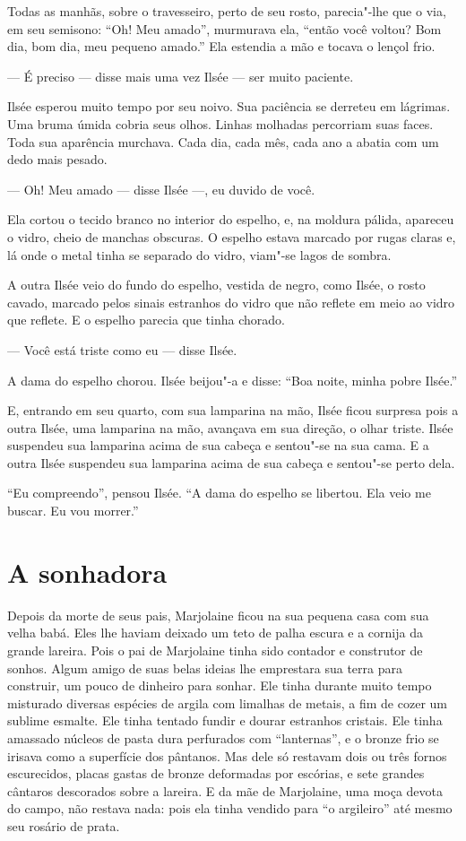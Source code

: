 Todas as manhãs, sobre o travesseiro, perto de seu rosto, parecia"-lhe
que o via, em seu semisono: “Oh! Meu amado'', murmurava ela, ``então você
voltou? Bom dia, bom dia, meu pequeno amado.” Ela estendia a mão e tocava
o lençol frio.

--- É preciso --- disse mais uma vez Ilsée --- ser muito paciente.

Ilsée esperou muito tempo por seu noivo. Sua paciência se derreteu em
lágrimas. Uma bruma úmida cobria seus olhos. Linhas molhadas percorriam
suas faces. Toda sua aparência murchava. Cada dia, cada mês, cada ano a
abatia com um dedo mais pesado.

--- Oh! Meu amado --- disse Ilsée ---, eu duvido de você.

Ela cortou o tecido branco no interior do espelho, e, na moldura
pálida, apareceu o vidro, cheio de manchas obscuras. O espelho estava
marcado por rugas claras e, lá onde o metal tinha se separado do vidro,
viam"-se lagos de sombra.

A outra Ilsée veio do fundo do espelho, vestida de negro, como Ilsée, o
rosto cavado, marcado pelos sinais estranhos do vidro que não reflete em meio
ao vidro que reflete. E o espelho parecia que tinha chorado.

--- Você está triste como eu --- disse Ilsée.

A dama do espelho chorou. Ilsée beijou"-a e disse: “Boa noite, minha pobre
Ilsée.”

E, entrando em seu quarto, com sua lamparina na mão, Ilsée ficou
surpresa pois a outra Ilsée, uma lamparina na mão, avançava em sua
direção, o olhar triste. Ilsée suspendeu sua lamparina acima de sua cabeça
e sentou"-se na sua cama. E a outra Ilsée suspendeu sua lamparina acima de
sua cabeça e sentou"-se perto dela.

“Eu compreendo”, pensou Ilsée. “A dama do espelho se libertou. Ela veio
me buscar. Eu vou morrer.”

\section*{A sonhadora}

Depois da morte de seus pais, Marjolaine ficou na sua pequena casa com
sua velha babá. Eles lhe haviam deixado um teto de palha escura e a
cornija da grande lareira. Pois o pai de Marjolaine tinha sido contador
e construtor de sonhos. Algum amigo de suas belas ideias lhe emprestara
sua terra para construir, um pouco de dinheiro para sonhar. Ele tinha
durante muito tempo misturado diversas espécies de argila com limalhas de
metais, a fim de cozer um sublime esmalte. Ele tinha tentado fundir e
dourar estranhos cristais. Ele tinha amassado núcleos de pasta dura
perfurados com “lanternas”, e o bronze frio se irisava como a superfície
dos pântanos. Mas dele só restavam dois ou três fornos escurecidos, placas
gastas de bronze deformadas por escórias, e sete grandes cântaros
descorados sobre a lareira. E da mãe de Marjolaine, uma moça devota do
campo, não restava nada: pois ela tinha vendido para “o argileiro” até
mesmo seu rosário de prata.

